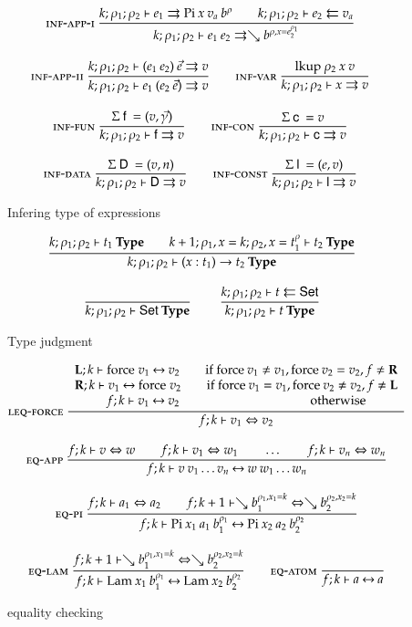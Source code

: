 \begin{figure}[p]
\begin{gather*}
\mbox{\sc inf-app-i}\ \dfrac{k;\rho_1;\rho_2\vdash e_1\rightrightarrows\mathrm{Pi} \: x \: v_a \: b^{\rho}
\qquad k;\rho_1;\rho_2\vdash e_2\leftleftarrows v_a}{k;\rho_1;\rho_2\vdash e_1 \: e_2\rightrightarrows\searrow b^{\rho,x=e_2^{\rho_1}}}
\\[2ex]
\mbox{\sc inf-app-ii}\ \dfrac{k;\rho_1;\rho_2\vdash(e_1 \: e_2)\:\vec{e}\rightrightarrows v}{k;\rho_1;\rho_2\vdash e_1 \: (e_2 \: \vec{e})\rightrightarrows v}
\qquad
\mbox{\sc inf-var}\ \dfrac{\mathrm{lkup} \: \rho_2 \: x \: v}{k;\rho_1;\rho_2\vdash x\rightrightarrows v}
\\[2ex]
\mbox{\sc inf-fun}\ \dfrac{\mathrm{\Sigma} \: \mathsf{f} \: = (v,\vec{\gamma}) }{k;\rho_1;\rho_2\vdash\mathsf{f}\rightrightarrows v}
\qquad
\mbox{\sc inf-con}\ \dfrac{\mathrm{\Sigma} \: \mathsf{c} \: = v}{k;\rho_1;\rho_2\vdash\mathsf{c}\rightrightarrows v}
\\[2ex] 
\mbox{\sc inf-data}\ \dfrac{\mathrm{\Sigma} \: \mathsf{D} \: = (v,n)}{k;\rho_1;\rho_2\vdash\mathsf{D}\rightrightarrows v} 
\qquad
\mbox{\sc inf-const}\ \dfrac{\mathrm{\Sigma} \: \mathsf{l} \: = (e,v)}{k;\rho_1;\rho_2\vdash\mathsf{l}\rightrightarrows v}
\end{gather*}
\caption{Infering type of expressions}
\end{figure}

\begin{figure}[p]
\begin{gather*}
\ \dfrac{k;\rho_1;\rho_2\vdash t_1\:\mathbf{Type}
\qquad
k+1;\rho_1,x=k;\rho_2,x=t_1^{\rho}\vdash t_2\:\mathbf{Type}}{k;\rho_1;\rho_2\vdash( x : t_1 ) \rightarrow{t_2}\:\mathbf{Type}}
\\[2ex]
\ \dfrac{}{k;\rho_1;\rho_2\vdash\mathsf{Set}\:\mathbf{Type}}
\qquad
\ \dfrac{k;\rho_1;\rho_2\vdash t\leftleftarrows\mathsf{Set}}{k;\rho_1;\rho_2\vdash t\:\mathbf{Type}}
\end{gather*}
\caption{Type judgment}
\end{figure}

\begin{figure}[p]
\begin{gather*}
\mbox{\sc leq-force}\ \dfrac{\begin{array}[b]{c}\mathbf{L};k\vdash\mathrm{force} \; v_1{\:\leftrightarrow\:}v_2 \qquad \mbox{if } \mathrm{force} \: v_1 \neq v_1 , \mathrm{force} \: v_2 = v_2  , f \neq \mathbf{R}
\\\mathbf{R};k\vdash v_1{\:\leftrightarrow\:}\mathrm{force} \; v_2 \qquad \mbox{if } \mathrm{force} \: v_1 = v_1 , \mathrm{force} \: v_2 \neq v_2 , f \neq \mathbf{L} \\f;k\vdash v_1{\:\leftrightarrow\:}v_2 \qquad \qquad \qquad \qquad \qquad \mbox{ otherwise}\end{array}}{f;k\vdash v_1\Leftrightarrow v_2}
\\[2ex]
\mbox{\sc eq-app}\ \dfrac{f;k\vdash v\Leftrightarrow w \qquad
f;k\vdash v_1\Leftrightarrow w_1 \qquad \ldots \qquad f;k\vdash v_n\Leftrightarrow w_n}{f;k\vdash v \: v_1 \ldots v_n{\:\leftrightarrow\:}w \: w_1 \ldots w_n}
\\[2ex]
\mbox{\sc eq-pi}\ \dfrac{f;k\vdash a_1\Leftrightarrow a_2
\qquad
f;k+1\vdash\searrow b_1^{\rho_1,x_1=k}\Leftrightarrow\searrow b_2^{\rho_2,x_2=k}}{f;k\vdash\mathrm{Pi} \: x_1 \: a_1 \: b_1^{\rho_1}{\:\leftrightarrow\:}\mathrm{Pi} \: x_2 \: a_2 \: b_2^{\rho_2}}
\\[2ex]
\mbox{\sc eq-lam}\ \dfrac{f;k+1\vdash\searrow b_1^{\rho_1,x_1=k}\Leftrightarrow\searrow b_2^{\rho_2,x_2=k}}{f;k\vdash\mathrm{Lam} \: x_1 \: b_1^{\rho_1}{\:\leftrightarrow\:}\mathrm{Lam} \: x_2 \: b_2^{\rho_2}}
\qquad
\mbox{\sc eq-atom}\ \dfrac{}{f;k\vdash a{\:\leftrightarrow\:}a}
\end{gather*}
\caption{equality checking}
\end{figure}

